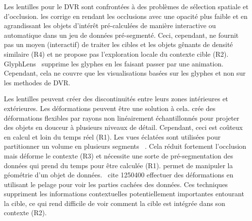 Les lentilles pour le DVR sont confrontées à des problèmes de sélection spatiale et d’occlusion. \cite{1532818} les corrige en rendant les occlusions avec une opacité plus faible et en agrandissant les objets d'intérêt pré-calculées de manière interactive ou automatique dans un jeu de données pré-segmenté. Ceci, cependant, ne fournit pas un moyen (interactif) de traiter les cibles et les objets gênants de densité similaire (R4) et ne propose pas l'exploration locale du contexte cible (R2). GlyphLens \, \cite{7539643} supprime les glyphes en les faisant passer par une animation. Cependant, cela ne couvre que les visualisations basées sur les glyphes et non sur les methodes de DVR.

Les lentilles peuvent créer des discontinuités entre leurs zones intérieures et extérieures. Les déformations peuvent être une solution à cela.
 \cite{Hsu:2011:RFM:2070781.2024165} crée des déformations flexibles par rayons non linéairement échantillonnés pour projeter des objets en douceur à plusieurs niveaux de détail. Cependant, ceci est coûteux en calcul et loin du temps réel (R1). Les vues éclatées sont utilisées pour partitionner un volume en plusieurs segments \, \cite{Sonnet:2004:IEA:989863.989871,4015467}. Cela réduit fortement l'occlusion mais déforme le contexte (R3) et nécessite une sorte de pré-segmentation des données qui prend du temps pour être calculée (R1). \cite{Correa:2007:IDD:1313046.1313163, Correa:2006:FAV:1187627.1187827} permet de manipuler la géométrie d'un objet de données. \ cite {1250400} effectuer des déformations en utilisant le pelage pour voir les parties cachées des données. Ces techniques suppriment les informations contextuelles potentiellement importantes entourant la cible, ce qui rend difficile de voir comment la cible est intégrée dans son contexte (R2).


